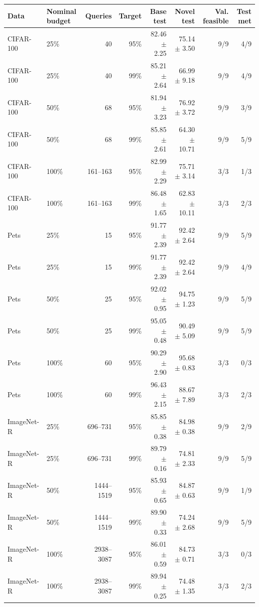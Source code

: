 \begin{tabular}{llrrrrrr}
\toprule
Data & Nominal budget & Queries & Target & Base test & Novel test & Val. feasible & Test met \\
\midrule
CIFAR-100 & 25\% & 40 & 95\% & 82.46 $\pm$ 2.25 & 75.14 $\pm$ 3.50 & 9/9 & 4/9 \\
CIFAR-100 & 25\% & 40 & 99\% & 85.21 $\pm$ 2.64 & 66.99 $\pm$ 9.18 & 9/9 & 4/9 \\
CIFAR-100 & 50\% & 68 & 95\% & 81.94 $\pm$ 3.23 & 76.92 $\pm$ 3.72 & 9/9 & 3/9 \\
CIFAR-100 & 50\% & 68 & 99\% & 85.85 $\pm$ 2.61 & 64.30 $\pm$ 10.71 & 9/9 & 5/9 \\
CIFAR-100 & 100\% & 161--163 & 95\% & 82.99 $\pm$ 2.29 & 75.71 $\pm$ 3.14 & 3/3 & 1/3 \\
CIFAR-100 & 100\% & 161--163 & 99\% & 86.48 $\pm$ 1.65 & 62.83 $\pm$ 10.11 & 3/3 & 2/3 \\
\midrule
Pets & 25\% & 15 & 95\% & 91.77 $\pm$ 2.39 & 92.42 $\pm$ 2.64 & 9/9 & 5/9 \\
Pets & 25\% & 15 & 99\% & 91.77 $\pm$ 2.39 & 92.42 $\pm$ 2.64 & 9/9 & 4/9 \\
Pets & 50\% & 25 & 95\% & 92.02 $\pm$ 0.95 & 94.75 $\pm$ 1.23 & 9/9 & 5/9 \\
Pets & 50\% & 25 & 99\% & 95.05 $\pm$ 0.48 & 90.49 $\pm$ 5.09 & 9/9 & 5/9 \\
Pets & 100\% & 60 & 95\% & 90.29 $\pm$ 2.90 & 95.68 $\pm$ 0.83 & 3/3 & 0/3 \\
Pets & 100\% & 60 & 99\% & 96.43 $\pm$ 2.15 & 88.67 $\pm$ 7.89 & 3/3 & 2/3 \\
\midrule
ImageNet-R & 25\% & 696--731 & 95\% & 85.85 $\pm$ 0.38 & 84.98 $\pm$ 0.38 & 9/9 & 2/9 \\
ImageNet-R & 25\% & 696--731 & 99\% & 89.79 $\pm$ 0.16 & 74.81 $\pm$ 2.33 & 9/9 & 5/9 \\
ImageNet-R & 50\% & 1444--1519 & 95\% & 85.93 $\pm$ 0.65 & 84.87 $\pm$ 0.63 & 9/9 & 1/9 \\
ImageNet-R & 50\% & 1444--1519 & 99\% & 89.90 $\pm$ 0.33 & 74.24 $\pm$ 2.68 & 9/9 & 5/9 \\
ImageNet-R & 100\% & 2938--3087 & 95\% & 86.01 $\pm$ 0.59 & 84.73 $\pm$ 0.71 & 3/3 & 0/3 \\
ImageNet-R & 100\% & 2938--3087 & 99\% & 89.94 $\pm$ 0.25 & 74.48 $\pm$ 1.35 & 3/3 & 2/3 \\
\bottomrule
\end{tabular}

